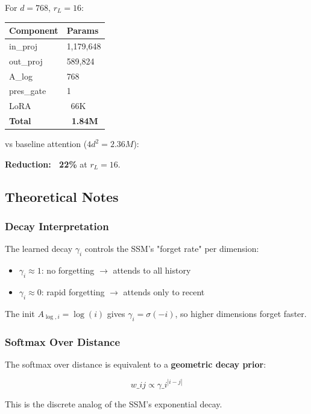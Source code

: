 For $d = 768$, $r_L = 16$:

\begin{table}[H]
\centering
\small
\begin{tabular}{ll}
\toprule
\textbf{Component} & \textbf{Params} \\
\midrule
in\_proj & 1,179,648 \\
out\_proj & 589,824 \\
A\_log & 768 \\
pres\_gate & 1 \\
LoRA & ~66K \\
\textbf{Total} & \textbf{~1.84M} \\
\bottomrule
\end{tabular}
\end{table}

vs baseline attention ($4 d^2 = 2.36M$):

\textbf{Reduction: ~22\%} at $r_L = 16$.

\subsection{Theoretical Notes}

\subsubsection{Decay Interpretation}

The learned decay $\gamma_i$ controls the SSM's "forget rate" per dimension:

\begin{itemize}
\item $\gamma_i \approx 1$: no forgetting $\to$ attends to all history
\item $\gamma_i \approx 0$: rapid forgetting $\to$ attends only to recent

\end{itemize}
The init $A_{\log, i} = \log(i)$ gives $\gamma_i = \sigma(-i)$, so higher 
dimensions forget faster.

\subsubsection{Softmax Over Distance}

The softmax over distance is equivalent to a \textbf{geometric decay prior}:

\[
w\_{ij} \propto \gamma\_i^{|i - j|}
\tag{4.16}
\]

This is the discrete analog of the SSM's exponential decay.

